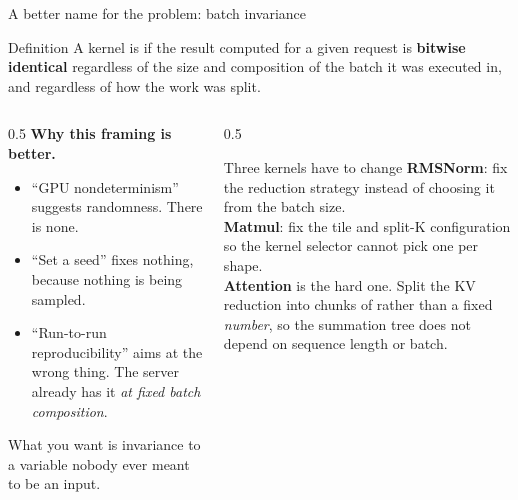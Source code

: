 \documentclass[aspectratio=169,10pt]{beamer}
\begin{document}
\begin{frame}[shrink=19]{A better name for the problem: batch invariance}
  \begin{block}{Definition}
    A kernel is  if the result computed for a given
    request is \textbf{bitwise identical} regardless of the size and
    composition of the batch it was executed in, and regardless of how the
    work was split.
  \end{block}
  \vspace{0.5em}
  \begin{columns}[T]
    \begin{column}{0.5\textwidth}
      \textbf{Why this framing is better.}
      \begin{itemize}\small
        \item ``GPU nondeterminism'' suggests randomness. There is none.
        \item ``Set a seed'' fixes nothing, because nothing is being sampled.
        \item ``Run-to-run reproducibility'' aims at the wrong thing. The
          server already has it \emph{at fixed batch composition}.
      \end{itemize}
      \vspace{0.4em}
      What you want is invariance to a variable nobody ever meant to be an
      input.
    \end{column}
    \begin{column}{0.5\textwidth}
      \begin{block}{Three kernels have to change}
        \small
        \textbf{RMSNorm}: fix the reduction strategy instead of choosing it
        from the batch size.\\[0.3em]
        \textbf{Matmul}: fix the tile and split-K configuration so the kernel
        selector cannot pick one per shape.\\[0.3em]
        \textbf{Attention} is the hard one. Split the KV reduction into chunks
        of  rather than a fixed \emph{number}, so the
        summation tree does not depend on sequence length or batch.
      \end{block}
    \end{column}
  \end{columns}
\end{frame}
\end{document}
